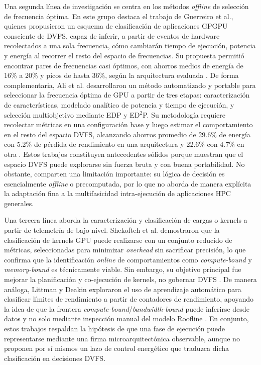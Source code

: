 \documentclass[12pt,oneside,spanish]{book}
\begin{document}
Una segunda línea de investigación se centra en los métodos \textit{offline} de selección de frecuencia óptima. En este grupo destaca el trabajo de Guerreiro et al., quienes propusieron un esquema de clasificación de aplicaciones GPGPU consciente de DVFS, capaz de inferir, a partir de eventos de hardware recolectados a una sola frecuencia, cómo cambiarán tiempo de ejecución, potencia y energía al recorrer el resto del espacio de frecuencias. Su propuesta permitió encontrar pares de frecuencias casi óptimos, con ahorros medios de energía de 16\% a 20\% y picos de hasta 36\%, según la arquitectura evaluada \cite{Guerreiro2019}. De forma complementaria, Ali et al. desarrollaron un método automatizado y portable para seleccionar la frecuencia óptima de GPU a partir de tres etapas: caracterización de características, modelado analítico de potencia y tiempo de ejecución, y selección multiobjetivo mediante EDP y ED$^{2}$P. Su metodología requiere recolectar métricas en una configuración base y luego estimar el comportamiento en el resto del espacio DVFS, alcanzando ahorros promedio de 29.6\% de energía con 5.2\% de pérdida de rendimiento en una arquitectura y 22.6\% con 4.7\% en otra \cite{Ali2023}. Estos trabajos constituyen antecedentes sólidos porque muestran que el espacio DVFS puede explorarse sin fuerza bruta y con buena portabilidad. No obstante, comparten una limitación importante: su lógica de decisión es esencialmente \textit{offline} o precomputada, por lo que no aborda de manera explícita la adaptación fina a la multifasicidad intra-ejecución de aplicaciones HPC generales.

Una tercera línea aborda la caracterización y clasificación de cargas o kernels a partir de telemetría de bajo nivel. Shekofteh et al. demostraron que la clasificación de kernels GPU puede realizarse con un conjunto reducido de métricas, seleccionadas para minimizar \textit{overhead} sin sacrificar precisión, lo que confirma que la identificación \textit{online} de comportamientos como \textit{compute-bound} y \textit{memory-bound} es técnicamente viable. Sin embargo, su objetivo principal fue mejorar la planificación y co-ejecución de kernels, no gobernar DVFS \cite{Shekofteh2019}. De manera análoga, Littman y Deakin exploraron el uso de aprendizaje automático para clasificar límites de rendimiento a partir de contadores de rendimiento, apoyando la idea de que la frontera \textit{compute-bound}/\textit{bandwidth-bound} puede inferirse desde datos y no solo mediante inspección manual del modelo Roofline \cite{Littman2025}. En conjunto, estos trabajos respaldan la hipótesis de que una fase de ejecución puede representarse mediante una firma microarquitectónica observable, aunque no proponen por sí mismos un lazo de control energético que traduzca dicha clasificación en decisiones DVFS.
\end{document}
